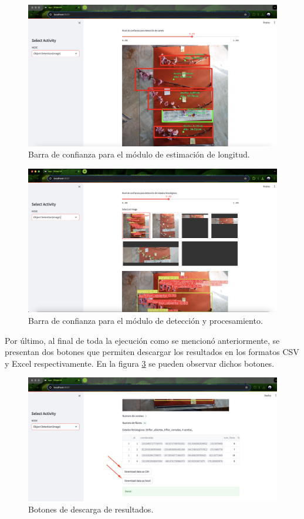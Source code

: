 \begin{figure}[h]
	\centering
	\includegraphics[scale=0.13]{./Figures/barra1.png}
	\caption{Barra de confianza para el módulo de estimación de longitud.}
	\label{fig:barra1}
\end{figure}


\begin{figure}[ht]
	\centering
	\includegraphics[scale=0.13]{./Figures/barra2.png}
	\caption{Barra de confianza para el módulo de detección y procesamiento.}
	\label{fig:barra2}
\end{figure}

Por último, al final de toda la ejecución como se mencionó anteriormente, se presentan dos botones que permiten descargar los resultados en los formatos CSV y Excel respectivamente. En la figura \ref{fig:botonesinf} se pueden observar dichos botones.
\clearpage
\begin{figure}[h]
	\centering
	\includegraphics[scale=0.13]{./Figures/botonesinf.png}
	\caption{Botones de descarga de resultados.}
	\label{fig:botonesinf}
\end{figure}


